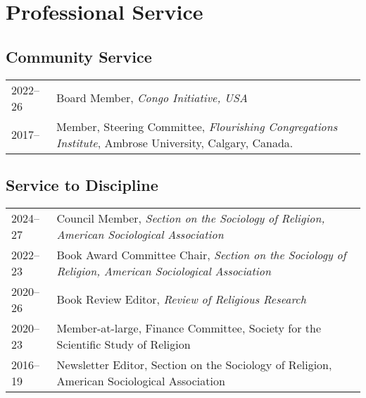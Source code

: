 \section*{Professional Service}
\newcommand{\tabitem}{~~\llap{\textbullet}~~}
\subsection*{Community Service}
\begin{tabular}{p{} p{}}
2022--26 & Board Member, \textit{Congo Initiative, USA}\\
2017-- & Member, Steering Committee, \textit{Flourishing Congregations Institute}, Ambrose University, Calgary, Canada.\\
\end{tabular}

\subsection*{Service to Discipline}

\begin{tabular}{p{} p{}}
2024--27 & Council Member, \textit{Section on the Sociology of Religion, American Sociological Association}\\
2022--23 & Book Award Committee Chair, \textit{Section on the Sociology of Religion, American Sociological Association}\\
2020--26 & Book Review Editor, \textit{Review of Religious Research}\\
2020--23 & Member-at-large, Finance Committee, Society for the Scientific Study of Religion\\
2016--19 & Newsletter Editor, Section on the Sociology of Religion, American Sociological Association\\
\end{tabular}


